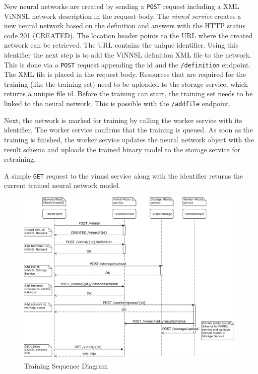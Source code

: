 New neural networks are created by sending a \texttt{POST} request
including a XML ViNNSL network description in the request body. The
\emph{vinnsl service} creates a new neural network based on the
definition and answers with the HTTP status code 201 (CREATED). The
location header points to the URL where the created network can be
retrieved. The URL contains the unique identifier. Using this identifier
the next step is to add the ViNNSL definition XML file to the network.
This is done via a \texttt{POST} request appending the id and the
\texttt{/definition} endpoint. The XML file is placed in the request
body. Resources that are required for the training (like the training
set) need to be uploaded to the storage service, which returns a unique
file id. Before the training can start, the training set needs to be
linked to the neural network. This is possible with the
\texttt{/addfile} endpoint.

Next, the network is marked for training by calling the worker service
with its identifier. The worker service confirms that the training is
queued. As soon as the training is finished, the worker service updates
the neural network object with the result schema and uploads the trained
binary model to the storage service for retraining.

A simple \texttt{GET} request to the vinnsl service along with the
identifier returns the current trained neural network model.

\begin{figure}
\centering
\includegraphics[width=15.00000cm]{images/training_sequence}
\caption{Training Sequence Diagram \label{img.training_sequence}}
\end{figure}

